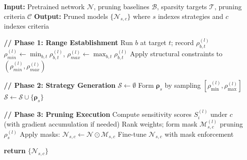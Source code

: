 \documentclass[11pt, conference]{IEEEtran}
\begin{document}
\begin{algorithm}[htbp]
\caption{Mix-and-Match Pruning Framework}
\label{alg:multistrategy}
\begin{algorithmic}[1]
\STATE \textbf{Input:} Pretrained network $\mathcal{N}$, pruning baselines $\mathcal{B}$, sparsity targets $\mathcal{T}$, pruning criteria $\mathcal{C}$
\STATE \textbf{Output:} Pruned models $\{\mathcal{N}_{s,c}\}$ where $s$ indexes strategies and $c$ indexes criteria

\STATE \textbf{// Phase 1: Range Establishment}
        \STATE Run $b$ at target $t$; record $\rho_{b,t}^{(l)}$
    \ENDFOR
\ENDFOR
{}
    \STATE $\rho_{min}^{(l)} \gets \min_{b,t}\rho_{b,t}^{(l)}$, \;
           $\rho_{max}^{(l)} \gets \max_{b,t}\rho_{b,t}^{(l)}$
    \STATE Apply structural constraints to $(\rho_{min}^{(l)},\rho_{max}^{(l)})$
\ENDFOR

\STATE \textbf{// Phase 2: Strategy Generation}
\STATE $\mathcal{S} \gets \emptyset$
    \STATE Form $\boldsymbol{\rho}_s$ by sampling $[\rho_{\min}^{(l)},\rho_{\max}^{(l)}]$
    \STATE $\mathcal{S} \gets \mathcal{S} \cup \{\boldsymbol{\rho}_s\}$
\ENDFOR

\STATE \textbf{// Phase 3: Pruning Execution}
        \STATE Compute sensitivity scores $S_i^{(l)}$ under $c$ (with gradient accumulation if needed)
            \STATE Rank weights; form mask $\mathcal{M}_{s,c}^{(l)}$ pruning $\rho_s^{(l)}$
        \ENDFOR
        \STATE Apply masks: $\mathcal{N}_{s,c} \gets \mathcal{N} \odot \mathcal{M}_{s,c}$
        \STATE Fine-tune $\mathcal{N}_{s,c}$ with mask enforcement
    \ENDFOR
\ENDFOR

\STATE \textbf{return} $\{\mathcal{N}_{s,c}\}$
\end{algorithmic}
\end{algorithm}



\end{document}
